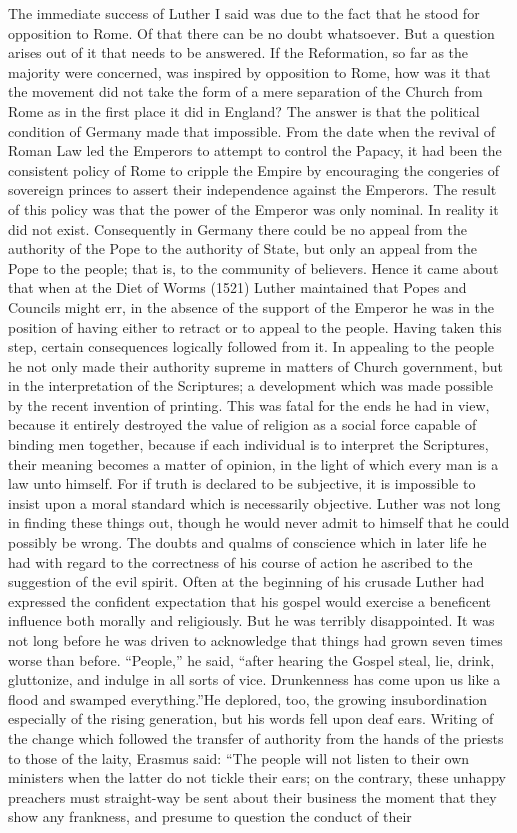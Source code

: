 \documentclass{book}
\begin{document}
The immediate success of Luther I said was due to the fact that he stood for opposition to Rome. Of that there can be no doubt whatsoever. But a question arises out of it that needs to be answered. If the Reformation, so far as the majority were concerned, was inspired by opposition to Rome, how was it that the movement did not take the form of a mere separation of the Church from Rome as in the first place it did in England? The answer is that the political condition of Germany made that impossible. From the date when the revival of Roman Law led the Emperors to attempt to control the Papacy, it had been the consistent policy of Rome to cripple the Empire by encouraging the congeries of sovereign princes to assert their independence against the Emperors. The result of this policy was that the power of the Emperor was only nominal. In reality it did not exist. Consequently in Germany there could be no appeal from the authority of the Pope to the authority of State, but only an appeal from the Pope to the people; that is, to the community of believers. Hence it came about that when at the Diet of Worms (1521) Luther maintained that Popes and Councils might err, in the absence of the support of the Emperor he was in the position of having either to retract or to appeal to the people. Having taken this step, certain consequences logically followed from it. In appealing to the people he not only made their authority supreme in matters of Church government, but in the interpretation of the Scriptures; a development which was made possible by the recent invention of printing. This was fatal for the ends he had in view, because it entirely destroyed the value of religion as a social force capable of binding men together, because if each individual is to interpret the Scriptures, their meaning becomes a matter of opinion, in the light of which every man is a law unto himself. For if truth is declared to be subjective, it is impossible to insist upon a moral standard which is necessarily objective. Luther was not long in finding these things out, though he would never admit to himself that he could possibly be wrong. The doubts and qualms of conscience which in later life he had with regard to the correctness of his course of action he ascribed to the suggestion of the evil spirit. Often at the beginning of his crusade Luther had expressed the confident expectation that his gospel would exercise a beneficent influence both morally and religiously. But he was terribly disappointed. It was not long before he was driven to acknowledge that things had grown seven times worse than before. “People,” he said, “after hearing the Gospel steal, lie, drink, gluttonize, and indulge in all sorts of vice. Drunkenness has come upon us like a flood and swamped everything.”\footnotemark[2] He deplored, too, the growing insubordination especially of the rising generation, but his words fell upon deaf ears. Writing of the change which followed the transfer of authority from the hands of the priests to those of the laity, Erasmus said: “The people will not listen to their own ministers when the latter do not tickle their ears; on the contrary, these unhappy preachers must straight-way be sent about their business the moment that they show any frankness, and presume to question the conduct of their 
\end{document}
